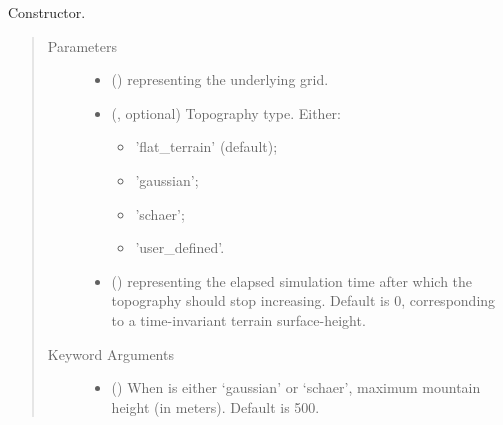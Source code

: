 \documentclass[letterpaper,10pt,english]{sphinxmanual}
\begin{document}
\begin{fulllineitems}
\begin{quote}
\begin{description}
\begin{itemize}
\end{itemize}

\end{description}\end{quote}

\begin{fulllineitems}
\label{\detokenize{api:tasmania.grids.topography.Topography2d.__init__}}
Constructor.
\begin{quote}\begin{description}
\item[{Parameters}] \leavevmode\begin{itemize}
\item {} 
 () \textendash{} {\hyperref[\detokenize{api:tasmania.grids.grid_xy.GridXY}]{}} representing the underlying grid.

\item {} 
 (, optional) \textendash{} 
Topography type. Either:
\begin{itemize}
\item {} 
’flat\_terrain’ (default);

\item {} 
’gaussian’;

\item {} 
’schaer’;

\item {} 
’user\_defined’.

\end{itemize}


\item {} 
 () \textendash{}  representing the elapsed simulation time after which the topography
should stop increasing. Default is 0, corresponding to a time-invariant terrain surface-height.

\end{itemize}

\item[{Keyword Arguments}] \leavevmode\begin{itemize}
\item {} 
 () \textendash{} When  is either ‘gaussian’ or ‘schaer’, maximum mountain height (in meters).
Default is 500.


\end{itemize}
\end{description}
\end{quote}
\end{fulllineitems}
\end{fulllineitems}
\end{document}
